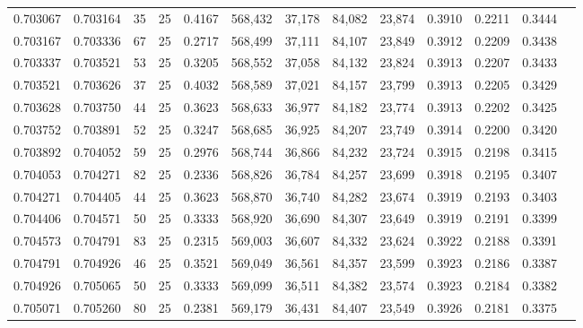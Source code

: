 \begin{tabular}{rrrrrrrrrrrrr}
0.703067 & 0.703164 &    35 &  25 &                                     0.4167 & 568,432 &  37,178 &  84,082 &  23,874 & 0.3910 & 0.2211 & 0.3444 \\
0.703167 & 0.703336 &    67 &  25 &                                     0.2717 & 568,499 &  37,111 &  84,107 &  23,849 & 0.3912 & 0.2209 & 0.3438 \\
0.703337 & 0.703521 &    53 &  25 &                                     0.3205 & 568,552 &  37,058 &  84,132 &  23,824 & 0.3913 & 0.2207 & 0.3433 \\
0.703521 & 0.703626 &    37 &  25 &                                     0.4032 & 568,589 &  37,021 &  84,157 &  23,799 & 0.3913 & 0.2205 & 0.3429 \\
0.703628 & 0.703750 &    44 &  25 &                                     0.3623 & 568,633 &  36,977 &  84,182 &  23,774 & 0.3913 & 0.2202 & 0.3425 \\
0.703752 & 0.703891 &    52 &  25 &                                     0.3247 & 568,685 &  36,925 &  84,207 &  23,749 & 0.3914 & 0.2200 & 0.3420 \\
0.703892 & 0.704052 &    59 &  25 &                                     0.2976 & 568,744 &  36,866 &  84,232 &  23,724 & 0.3915 & 0.2198 & 0.3415 \\
0.704053 & 0.704271 &    82 &  25 &                                     0.2336 & 568,826 &  36,784 &  84,257 &  23,699 & 0.3918 & 0.2195 & 0.3407 \\
0.704271 & 0.704405 &    44 &  25 &                                     0.3623 & 568,870 &  36,740 &  84,282 &  23,674 & 0.3919 & 0.2193 & 0.3403 \\
0.704406 & 0.704571 &    50 &  25 &                                     0.3333 & 568,920 &  36,690 &  84,307 &  23,649 & 0.3919 & 0.2191 & 0.3399 \\
0.704573 & 0.704791 &    83 &  25 &                                     0.2315 & 569,003 &  36,607 &  84,332 &  23,624 & 0.3922 & 0.2188 & 0.3391 \\
0.704791 & 0.704926 &    46 &  25 &                                     0.3521 & 569,049 &  36,561 &  84,357 &  23,599 & 0.3923 & 0.2186 & 0.3387 \\
0.704926 & 0.705065 &    50 &  25 &                                     0.3333 & 569,099 &  36,511 &  84,382 &  23,574 & 0.3923 & 0.2184 & 0.3382 \\
0.705071 & 0.705260 &    80 &  25 &                                     0.2381 & 569,179 &  36,431 &  84,407 &  23,549 & 0.3926 & 0.2181 & 0.3375 \\

\end{tabular}
